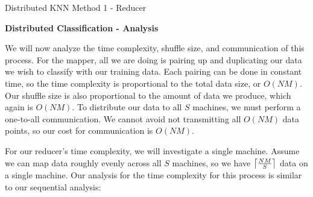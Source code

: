 \begin{algorithm}[ht!]
\DontPrintSemicolon
{}
\caption{Distributed KNN Method 1 - Reducer\label{KNN1r}}
\end{algorithm}

\vspace{5 mm}
\noindent
\textbf{Distributed Classification - Analysis}

\vspace{5 mm}
\noindent
We will now analyze the time complexity, shuffle size, and communication of
this process. For the mapper, all we are doing is pairing up and duplicating our
data we wish to classify with our training data. Each pairing can be done in
constant time, so the time complexity is proportional to the total data size,
or $O(N M)$. Our shuffle size is also proportional to the amount of data we
produce, which again is $O(N M)$. To distribute our data to all $S$ machines, 
we must perform a one-to-all communication. We cannot avoid not transmitting 
all $O(N M)$ data points, so our cost for communication is $O(N M)$.

\vspace{5 mm}
\noindent
For our reducer's time complexity, we will investigate a single machine. Assume 
we can map data roughly evenly across all $S$ machines, so we have 
$\ceil*{\frac{N M}{S}}$ data on a single machine. Our analysis for the time 
complexity for this process is similar to our sequential analysis:

